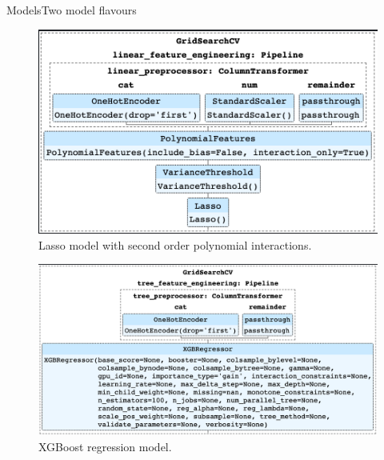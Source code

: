 \documentclass[10pt]{beamer}
\begin{document}
\begin{frame}{Models}{Two model flavours}
\begin{center}
  \begin{figure}
    \includegraphics[scale=0.3]{images/linear_grid_search.png}
    \caption{Lasso model with second order polynomial interactions.}
  \end{figure}
\end{center}
\begin{center}
  \begin{figure}
    \includegraphics[scale=0.3]{images/tree_grid_search.png}
    \caption{XGBoost regression model.}
  \end{figure}
\end{center}
\end{frame}
\end{document}
